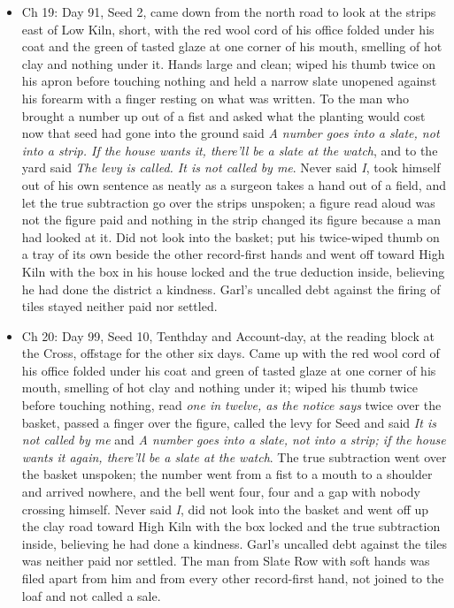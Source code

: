 \documentclass{design/chronicle}
\begin{document}
{\begin{itemize}[leftmargin=1.4em,itemsep=1pt,topsep=3pt,parsep=0pt]
\item Ch 19: Day 91, Seed 2, came down from the north road to look at the strips east of Low Kiln, short, with the red wool cord of his office folded under his coat and the green of tasted glaze at one corner of his mouth, smelling of hot clay and nothing under it. Hands large and clean; wiped his thumb twice on his apron before touching nothing and held a narrow slate unopened against his forearm with a finger resting on what was written. To the man who brought a number up out of a fist and asked what the planting would cost now that seed had gone into the ground said \emph{A number goes into a slate, not into a strip. If the house wants it, there’ll be a slate at the watch}, and to the yard said \emph{The levy is called. It is not called by me}. Never said \emph{I}, took himself out of his own sentence as neatly as a surgeon takes a hand out of a field, and let the true subtraction go over the strips unspoken; a figure read aloud was not the figure paid and nothing in the strip changed its figure because a man had looked at it. Did not look into the basket; put his twice-wiped thumb on a tray of its own beside the other record-first hands and went off toward High Kiln with the box in his house locked and the true deduction inside, believing he had done the district a kindness. Garl’s uncalled debt against the firing of tiles stayed neither paid nor settled.

\end{itemize}

\begin{itemize}[leftmargin=1.4em,itemsep=1pt,topsep=3pt,parsep=0pt]

\item Ch 20: Day 99, Seed 10, Tenthday and Account-day, at the reading block at the Cross, offstage for the other six days. Came up with the red wool cord of his office folded under his coat and green of tasted glaze at one corner of his mouth, smelling of hot clay and nothing under it; wiped his thumb twice before touching nothing, read \emph{one in twelve, as the notice says} twice over the basket, passed a finger over the figure, called the levy for Seed and said \emph{It is not called by me} and \emph{A number goes into a slate, not into a strip; if the house wants it again, there’ll be a slate at the watch}. The true subtraction went over the basket unspoken; the number went from a fist to a mouth to a shoulder and arrived nowhere, and the bell went four, four and a gap with nobody crossing himself. Never said \emph{I}, did not look into the basket and went off up the clay road toward High Kiln with the box locked and the true subtraction inside, believing he had done a kindness. Garl’s uncalled debt against the tiles was neither paid nor settled. The man from Slate Row with soft hands was filed apart from him and from every other record-first hand, not joined to the loaf and not called a sale.

\end{itemize}
}
\end{document}

